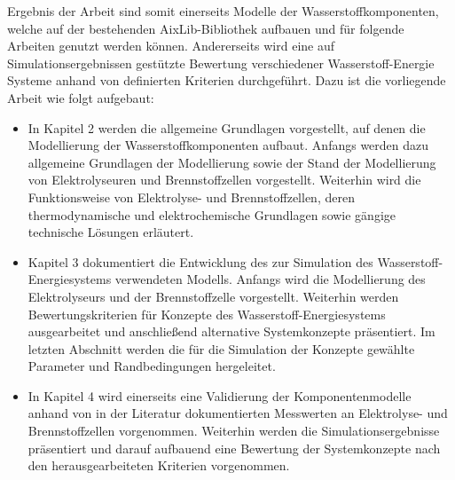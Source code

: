 Ergebnis der Arbeit sind somit einerseits Modelle der Wasserstoffkomponenten, welche auf der bestehenden AixLib-Bibliothek aufbauen und für folgende Arbeiten genutzt werden können. Andererseits wird eine auf Simulationsergebnissen gestützte Bewertung verschiedener Wasserstoff-Energie Systeme anhand von definierten Kriterien durchgeführt. Dazu ist die vorliegende Arbeit wie folgt aufgebaut:

\begin{itemize}
\item In Kapitel 2 werden die allgemeine Grundlagen vorgestellt, auf denen die Modellierung der Wasserstoffkomponenten aufbaut. Anfangs werden dazu allgemeine Grundlagen der Modellierung sowie der Stand der Modellierung von Elektrolyseuren und Brennstoffzellen vorgestellt. Weiterhin wird die Funktionsweise von Elektrolyse- und Brennstoffzellen, deren thermodynamische und elektrochemische Grundlagen sowie gängige technische Lösungen erläutert.
\item Kapitel 3 dokumentiert die Entwicklung des zur Simulation des Wasserstoff-Energiesystems verwendeten Modells. Anfangs wird die Modellierung des Elektrolyseurs und der Brennstoffzelle vorgestellt. Weiterhin werden Bewertungskriterien für Konzepte des Wasserstoff-Energiesystems ausgearbeitet und anschließend alternative Systemkonzepte präsentiert. Im letzten Abschnitt werden die für die Simulation der Konzepte gewählte Parameter und Randbedingungen hergeleitet.
\item In Kapitel 4 wird einerseits eine Validierung der Komponentenmodelle anhand von in der Literatur dokumentierten Messwerten an Elektrolyse- und Brennstoffzellen vorgenommen. Weiterhin werden die Simulationsergebnisse präsentiert und darauf aufbauend eine Bewertung der Systemkonzepte nach den herausgearbeiteten Kriterien vorgenommen.
\end{itemize}